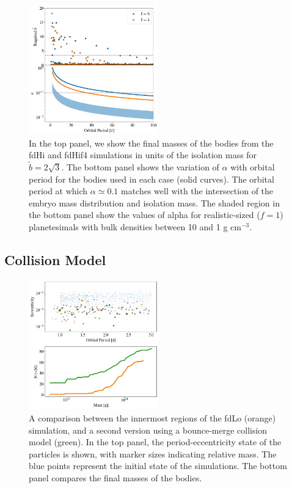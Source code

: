\documentclass[twocolumn]{aastex63}
\begin{document}
\begin{figure}
\begin{center}
    \includegraphics[width=0.5\textwidth]{figures/f6f4_b.png}
    \caption{In the top panel, we show the final masses of the bodies
      from the fdHi and fdHif4 simulations in units of the isolation
      mass for $\tilde{b} = 2\sqrt{3}$. The bottom panel shows the variation of $\alpha$ with orbital period for the bodies used in each case (solid curves). The orbital period at which $\alpha \simeq 0.1$ matches well with the intersection of the embryo mass distribution and isolation mass. The shaded region in the bottom panel show the values of alpha for realistic-sized ($f=1$) planetesimals with bulk densities between 10 and 1 g cm$^{-3}$.\label{fig:f6f4_b}}
\end{center}
\end{figure}

\subsection{Collision Model}

\begin{figure}
\begin{center}
    \includegraphics[width=0.5\textwidth]{figures/frag_ecc.png}
    \caption{A comparison between the innermost regions of the fdLo (orange) simulation, and a second version using a bounce-merge collision model (green). In the top panel, the period-eccentricity state of the particles is shown, with marker sizes indicating relative mass. The blue points represent the initial state of the simulations. The bottom panel compares the final masses of the bodies. \label{fig:frag_ecc}}
\end{center}
\end{figure}
\end{document}
